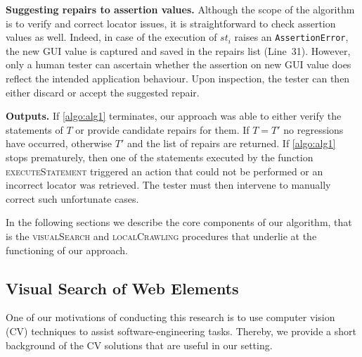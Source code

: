 \noindent
\textbf{Suggesting repairs to assertion values.}
Although the scope of the algorithm is to verify and correct locator issues, it is straightforward to check assertion values as well. Indeed, in case of the execution of $st_i$ raises an \texttt{AssertionError}, the new GUI value is captured and saved in the repairs list (Line~31). 
However, only a human tester can ascertain whether the assertion on new GUI value does reflect the intended application behaviour. Upon inspection, the tester can then either discard or accept the suggested repair.

\noindent
\textbf{Outputs.}
If \autoref{algo:alg1} terminates, our approach was able to either verify the statements of $T$ or provide candidate repairs for them. 
If $T = T'$ no regressions have occurred, otherwise $T'$ and the list of repairs are returned.
If \autoref{algo:alg1} stops prematurely, then one of the statements executed by the function \textsc{executeStatement} triggered an action that could not be performed or an incorrect locator was retrieved. The tester must then intervene to manually correct such unfortunate cases.

In the following sections we describe the core components of our algorithm, that is the \textsc{visualSearch} and \textsc{localCrawling} procedures that underlie at the functioning of our approach.

\subsection{Visual Search of Web Elements}\label{sec:vis}

One of our motivations of conducting this research is to use computer vision (CV) techniques to assist software-engineering tasks. 
Thereby, we provide a short background of the CV solutions that are useful in our setting.

